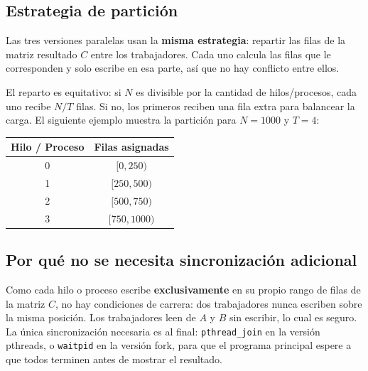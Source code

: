 \subsection{Estrategia de partición}

Las tres versiones paralelas usan la \textbf{misma estrategia}: repartir las filas de la matriz resultado $C$ entre los trabajadores. Cada uno calcula las filas que le corresponden y solo escribe en esa parte, así que no hay conflicto entre ellos.

El reparto es equitativo: si $N$ es divisible por la cantidad de hilos/procesos, cada uno recibe $N/T$ filas. Si no, los primeros reciben una fila extra para balancear la carga. El siguiente ejemplo muestra la partición para $N = 1000$ y $T = 4$:

\begin{center}
\begin{tabular}{|c|c|}
\hline
\textbf{Hilo / Proceso} & \textbf{Filas asignadas} \\
\hline
0 & $[0, 250)$ \\
1 & $[250, 500)$ \\
2 & $[500, 750)$ \\
3 & $[750, 1000)$ \\
\hline
\end{tabular}
\end{center}

\subsection{Por qué no se necesita sincronización adicional}

Como cada hilo o proceso escribe \textbf{exclusivamente} en su propio rango de filas de la matriz $C$, no hay condiciones de carrera: dos trabajadores nunca escriben sobre la misma posición. Los trabajadores leen de $A$ y $B$ sin escribir, lo cual es seguro. La única sincronización necesaria es al final: \texttt{pthread\_join} en la versión pthreads, o \texttt{waitpid} en la versión fork, para que el programa principal espere a que todos terminen antes de mostrar el resultado.
